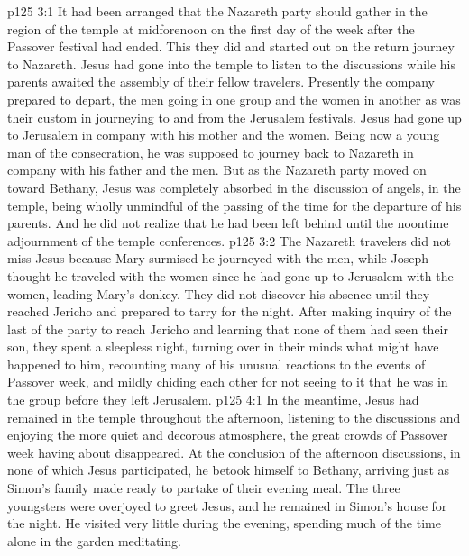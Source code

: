 %
\vs p125 3:1 It had been arranged that the Nazareth party should gather in the region of the temple at midforenoon on the first day of the week after the Passover festival had ended. This they did and started out on the return journey to Nazareth. Jesus had gone into the temple to listen to the discussions while his parents awaited the assembly of their fellow travelers. Presently the company prepared to depart, the men going in one group and the women in another as was their custom in journeying to and from the Jerusalem festivals. Jesus had gone up to Jerusalem in company with his mother and the women. Being now a young man of the consecration, he was supposed to journey back to Nazareth in company with his father and the men. But as the Nazareth party moved on toward Bethany, Jesus was completely absorbed in the discussion of angels, in the temple, being wholly unmindful of the passing of the time for the departure of his parents. And he did not realize that he had been left behind until the noontime adjournment of the temple conferences.
\vs p125 3:2 The Nazareth travelers did not miss Jesus because Mary surmised he journeyed with the men, while Joseph thought he traveled with the women since he had gone up to Jerusalem with the women, leading Mary’s donkey. They did not discover his absence until they reached Jericho and prepared to tarry for the night. After making inquiry of the last of the party to reach Jericho and learning that none of them had seen their son, they spent a sleepless night, turning over in their minds what might have happened to him, recounting many of his unusual reactions to the events of Passover week, and mildly chiding each other for not seeing to it that he was in the group before they left Jerusalem.\plusone
{}
\vs p125 4:1 In the meantime, Jesus had remained in the temple throughout the afternoon, listening to the discussions and enjoying the more quiet and decorous atmosphere, the great crowds of Passover week having about disappeared. At the conclusion of the afternoon discussions, in none of which Jesus participated, he betook himself to Bethany, arriving just as Simon’s family made ready to partake of their evening meal. The three youngsters were overjoyed to greet Jesus, and he remained in Simon’s house for the night. He visited very little during the evening, spending much of the time alone in the garden meditating.
